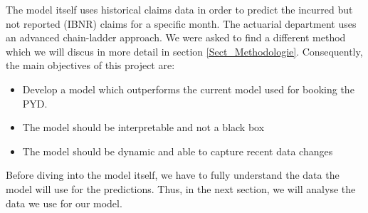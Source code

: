 The model itself uses historical claims data in order to predict the incurred but not reported (IBNR) claims for a specific month. The actuarial department uses an advanced chain-ladder approach. We were asked to find a different method which we will discus in more detail in section \ref{Sect_Methodologie}. Consequently, the main objectives of this project are:
\begin{itemize}
	\item Develop a model which outperforms the current model used for booking the PYD.
	\item The model should be interpretable and not a black box
	\item The model should be dynamic and able to capture recent data changes
\end{itemize}
Before diving into the model itself, we have to fully understand the data the model will use for the predictions. Thus, in the next section, we will analyse the data we use for our model.

 

	
	